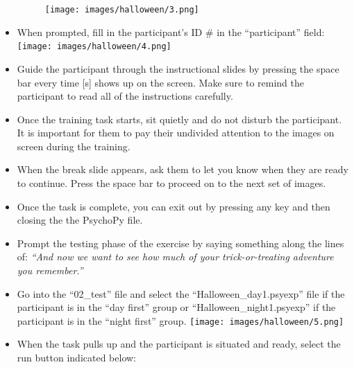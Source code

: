 \documentclass[
]{book}
\begin{document}
\begin{itemize}
  \begin{figure}
  \centering
  \texttt{[image: images/halloween/3.png]}
  \caption{}
  \end{figure}
\item
  When prompted, fill in the participant's ID \# in the ``participant'' field:
  \texttt{[image: images/halloween/4.png]}
\item
  Guide the participant through the instructional slides by pressing the space bar every time {[}s{]} shows up on the screen. Make sure to remind the participant to read all of the instructions carefully.
\item
  Once the training task starts, sit quietly and do not disturb the participant. It is important for them to pay their undivided attention to the images on screen during the training.
\item
  When the break slide appears, ask them to let you know when they are ready to continue. Press the space bar to proceed on to the next set of images.
\item
  Once the task is complete, you can exit out by pressing any key and then closing the the PsychoPy file.
\item
  Prompt the testing phase of the exercise by saying something along the lines of:
  \emph{``And now we want to see how much of your trick-or-treating adventure you remember.''}
\item
  Go into the ``02\_test'' file and select the ``Halloween\_day1.psyexp'' file if the participant is in the ``day first'' group or ``Halloween\_night1.psyexp'' if the participant is in the ``night first'' group.
  \texttt{[image: images/halloween/5.png]}
\item
  When the task pulls up and the participant is situated and ready, select the run button indicated below:


\end{itemize}
\end{document}
